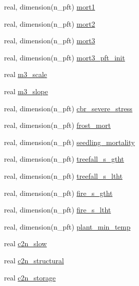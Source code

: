 \begin{DoxyCompactItemize}
\item 
real, dimension(n\+\_\+pft) \hyperlink{namespacepft__coms_a8a99e260a7d72b81ec6887289e4e8172}{mort1}
\item 
real, dimension(n\+\_\+pft) \hyperlink{namespacepft__coms_a869ad0792b73ae5285eeab0a57534f34}{mort2}
\item 
real, dimension(n\+\_\+pft) \hyperlink{namespacepft__coms_a20a7ffd42484a2150383fd540cd97641}{mort3}
\item 
real, dimension(n\+\_\+pft) \hyperlink{namespacepft__coms_a1a1f98514e1c80f9ab10a76eacb4f7eb}{mort3\+\_\+pft\+\_\+init}
\item 
real \hyperlink{namespacepft__coms_ad41cac7d6fa0b8d962cf3acd1d4b1587}{m3\+\_\+scale}
\item 
real \hyperlink{namespacepft__coms_a27553d075979c77be9aceaf78a289109}{m3\+\_\+slope}
\item 
real, dimension(n\+\_\+pft) \hyperlink{namespacepft__coms_aefc2c80125aa55f81fae3724cb4d5339}{cbr\+\_\+severe\+\_\+stress}
\item 
real, dimension(n\+\_\+pft) \hyperlink{namespacepft__coms_a744036814ca3b450807de9613e918153}{frost\+\_\+mort}
\item 
real, dimension(n\+\_\+pft) \hyperlink{namespacepft__coms_a0fe258b3674104f09d7226f87f39fc0b}{seedling\+\_\+mortality}
\item 
real, dimension(n\+\_\+pft) \hyperlink{namespacepft__coms_a0dde76d7d9a1502fb5b2095ac6ea30fb}{treefall\+\_\+s\+\_\+gtht}
\item 
real, dimension(n\+\_\+pft) \hyperlink{namespacepft__coms_af905b11e7eb1e1a30875d6b583839e92}{treefall\+\_\+s\+\_\+ltht}
\item 
real, dimension(n\+\_\+pft) \hyperlink{namespacepft__coms_a41960519e8244a038e84c2fe44b9a752}{fire\+\_\+s\+\_\+gtht}
\item 
real, dimension(n\+\_\+pft) \hyperlink{namespacepft__coms_ac154348fc689309b47112ac66a6df99d}{fire\+\_\+s\+\_\+ltht}
\item 
real, dimension(n\+\_\+pft) \hyperlink{namespacepft__coms_ae13d0f409c782cf00abbc9f09f55a5a8}{plant\+\_\+min\+\_\+temp}
\item 
real \hyperlink{namespacepft__coms_a4cd2632f30c0c38883e4191eb65e352b}{c2n\+\_\+slow}
\item 
real \hyperlink{namespacepft__coms_a8ff9ca7160d6ae9774adc3a314d8accd}{c2n\+\_\+structural}
\item 
real \hyperlink{namespacepft__coms_a2bdc4c753d41f0e863f3e00b13c8393f}{c2n\+\_\+storage}
\item 

\end{DoxyCompactItemize}

